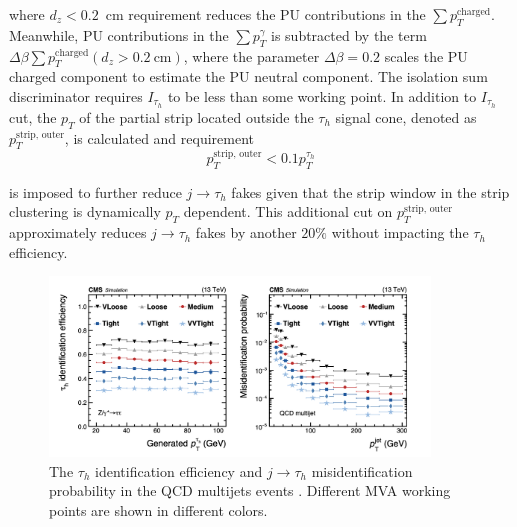 \noindent where $d_z<0.2$~cm requirement reduces the PU contributions in the $\sum p_T^{\text{charged}}$. Meanwhile, PU contributions in the $\sum p_T^ \gamma $ is subtracted by the term $\Delta \beta \sum p_T^{\text{charged}} (d_z>0.2~\text{cm}) $, where the parameter $\Delta \beta =0.2$ scales the PU charged component to estimate the PU neutral component. The isolation sum discriminator requires $I_{\tau_h} $ to be less than some working point. In addition to $I_{\tau_h}$ cut, the $p_T$ of the partial strip located outside the $\tau_h$ signal cone, denoted as $p_T^{\text{strip, outer}} $, is calculated and requirement
\begin{equation}
    p_T^{\text{strip, outer}} < 0.1 p_T^{\tau_h}
    \label{eqn:cmsexperiment:reconstruction:ptStripOuter}
\end{equation}

\noindent is imposed to further reduce $j \to \tau_h$ fakes given that the strip window in the strip clustering is dynamically $p_T$ dependent. This additional cut on $p_T^{\text{strip, outer}}$ approximately reduces $j \to \tau_h$ fakes by another $20\%$ without impacting the $\tau_h$ efficiency.


\begin{figure}[ht]
    \centering
    \includegraphics[width=0.9\textwidth]{chapters/CMSExperiment/sectionReconstruction/figures/tauMVA}
    \caption{ The $\tau_h$ identification efficiency and $j\to \tau_h$ misidentification probability in the QCD multijets events \cite{Sirunyan:2018pgf}. Different MVA working points are shown in different colors. }
    \label{fig:cmsexperiment:reconstruction:tauMVA}
\end{figure}



